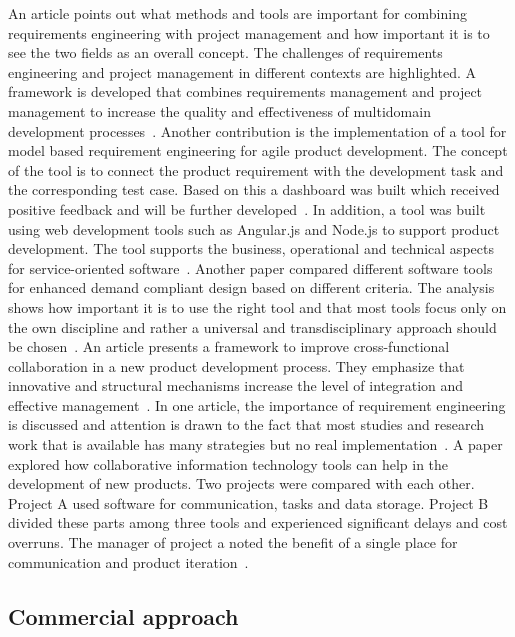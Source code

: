     An article points out what methods and tools are important for combining requirements engineering with project management and how important it is to see the two fields as an overall concept. The challenges of requirements engineering and project management in different contexts are highlighted. A framework is developed that combines requirements management and project management to increase the quality and effectiveness of multidomain development processes~\cite{Jorma2014}.
    Another contribution is the implementation of a tool for model based requirement engineering for agile product development. The concept of the tool is to connect the product requirement with the development task and the corresponding test case. Based on this a dashboard was built which received positive feedback and will be further developed~\cite{WINDISCH2022550}.
    In addition, a tool was built using web development tools such as Angular.js and Node.js to support product development. The tool supports the business, operational and technical aspects for service-oriented software~\cite{belfadel2022requirements}.
    Another paper compared different software tools for enhanced demand compliant design based on different criteria. The analysis shows how important it is to use the right tool and that most tools focus only on the own discipline and rather a universal and transdisciplinary approach should be chosen~\cite{9447081}.
    An article presents a framework to improve cross-functional collaboration in a new product development process. They emphasize that innovative and structural mechanisms increase the level of integration and effective management~\cite{Jassawalla}.
    In one article, the importance of requirement engineering is discussed and attention is drawn to the fact that most studies and research work that is available has many strategies but no real implementation~\cite{kumar2022requirements}.
    A paper explored how collaborative information technology tools can help in the development of new products. Two projects were compared with each other. Project A used software for communication, tasks and data storage. Project B divided these parts among three tools and experienced significant delays and cost overruns. The manager of project a noted the benefit of a single place for communication and product iteration~\cite{marion_fixson_2019}.

    \subsection*{Commercial approach}
